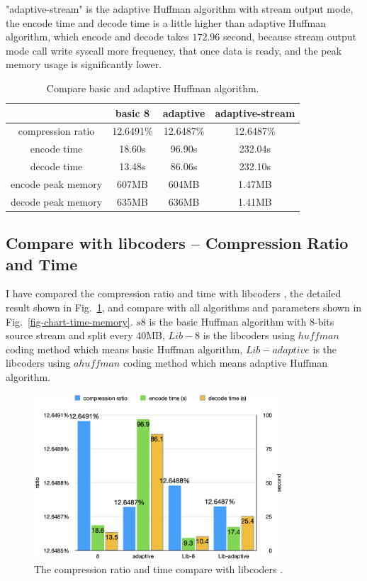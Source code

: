 \documentclass[a4paper,conference]{IEEEtran}
\begin{document}
"adaptive-stream" is the adaptive Huffman algorithm with stream output mode, the encode time and decode time is a little higher than adaptive Huffman algorithm, which encode and decode takes $172.96$ second, because stream output mode call write syscall more frequency, that once data is ready, and the peak memory usage is significantly lower.

\begin{table}[htbp]
\caption{Compare basic and adaptive Huffman algorithm.}
\begin{center}
\begin{tabular}{|c|c|c|c|}
\hline
& \textbf{basic 8} & \textbf{adaptive} & \textbf{adaptive-stream} \\
\hline
compression ratio & 12.6491\% & 12.6487\% & 12.6487\% \\
\hline
encode time & 18.60s & 96.90s & 232.04s \\
\hline
decode time & 13.48s & 86.06s & 232.10s \\
\hline
encode peak memory & 607MB & 604MB & 1.47MB \\
\hline
decode peak memory & 635MB & 636MB & 1.41MB \\
\hline
\end{tabular}
\label{tab-compare-basic-adaptive}
\end{center}
\end{table}

\subsection{Compare with libcoders -- Compression Ratio and Time}

I have compared the compression ratio and time with libcoders \cite{libcoders}, the detailed result shown in Fig.~\ref{fig-chart-compare-lib}, and compare with all algorithms and parameters shown in Fig.~\ref{fig-chart-time-memory}. $s8$ is the basic Huffman algorithm with $8$-bits source stream and split every 40MB, $Lib-8$ is the libcoders using $huffman$ coding method which means basic Huffman algorithm, $Lib-adaptive$ is the libcoders using $ahuffman$ coding method which means adaptive Huffman algorithm.

\begin{figure}[htbp]
\centerline{\includegraphics[height=6.15cm, keepaspectratio,]{assets/chart-compare-lib.png}}
\caption{The compression ratio and time compare with libcoders \cite{libcoders}.}
\label{fig-chart-compare-lib}
\end{figure}
\end{document}
